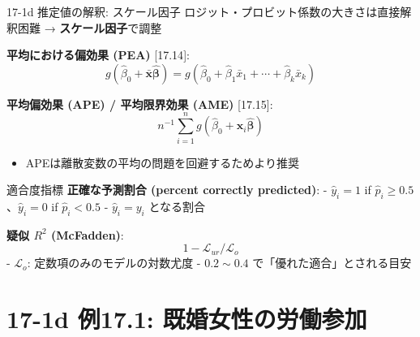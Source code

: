 \documentclass[
  ignorenonframetext,
]{beamer}
\providecommand{\tightlist}{%
  \setlength{\itemsep}{0pt}\setlength{\parskip}{0pt}}
\begin{document}
\begin{frame}{17-1d 推定値の解釈: スケール因子}
\protect\hypertarget{d-ux63a8ux5b9aux5024ux306eux89e3ux91c8-ux30b9ux30b1ux30fcux30ebux56e0ux5b50}{}
ロジット・プロビット係数の大きさは直接解釈困難 →
\textbf{スケール因子}で調整

\textbf{平均における偏効果 (PEA)} {[}17.14{]}:
\[g(\hat{\beta}_0 + \bar{\mathbf{x}}\hat{\boldsymbol{\beta}}) = g\!\left(\hat{\beta}_0 + \hat{\beta}_1\bar{x}_1 + \cdots + \hat{\beta}_k\bar{x}_k\right)\]

\textbf{平均偏効果 (APE) / 平均限界効果 (AME)} {[}17.15{]}:
\[n^{-1}\sum_{i=1}^n g(\hat{\beta}_0 + \mathbf{x}_i\hat{\boldsymbol{\beta}})\]

\begin{itemize}
\tightlist
\item
  APEは離散変数の平均の問題を回避するためより推奨
\end{itemize}
\end{frame}

\begin{frame}{適合度指標}
\protect\hypertarget{ux9069ux5408ux5ea6ux6307ux6a19}{}
\textbf{正確な予測割合 (percent correctly predicted)}: -
\(\hat{y}_i = 1\) if \(\hat{p}_i \geq 0.5\)、\(\hat{y}_i = 0\) if
\(\hat{p}_i < 0.5\) - \(\hat{y}_i = y_i\) となる割合

\textbf{疑似 \(R^2\) (McFadden)}: \[1 - \mathcal{L}_{ur}/\mathcal{L}_o\]
- \(\mathcal{L}_o\): 定数項のみのモデルの対数尤度 - \(0.2 \sim 0.4\)
で「優れた適合」とされる目安
\end{frame}

\hypertarget{d-ux4f8b17.1-ux65e2ux5a5aux5973ux6027ux306eux52b4ux50cdux53c2ux52a0}{%
\section{17-1d 例17.1:
既婚女性の労働参加}\label{d-ux4f8b17.1-ux65e2ux5a5aux5973ux6027ux306eux52b4ux50cdux53c2ux52a0}}
\end{document}

